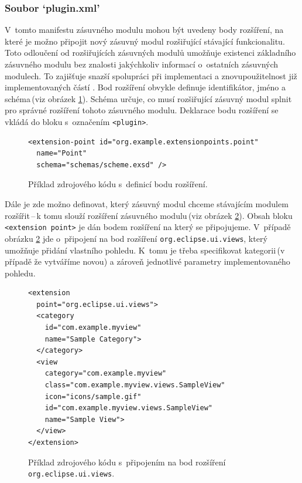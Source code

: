       \subsubsection{Soubor `plugin.xml'}
      V~tomto manifestu zásuvného modulu mohou být uvedeny body rozšíření, na které je možno připojit nový zásuvný modul rozšiřující stávající funkcionalitu. Toto odloučení od rozšiřujících zásuvných modulů umožňuje existenci základního zásuvného modulu bez znalosti jakýchkoliv informací o~ostatních zásuvných modulech. To zajišťuje snazší spolupráci při implementaci a znovupoužitelnost již implementovaných částí \cite{Plugins}. Bod rozšíření obvykle definuje identifikátor, jméno a schéma\,(viz obrázek \ref{code:extension_point_declaration}). Schéma určuje, co musí rozšiřující zásuvný modul splnit pro správné rozšíření tohoto zásuvného modulu. Deklarace bodu rozšíření se vkládá do bloku s~označením \texttt{<plugin>}. 

      \lstset{language=xml}
      \begin{figure}
	\begin{lstlisting}[frame=single]
<extension-point id="org.example.extensionpoints.point"
  name="Point"
  schema="schemas/scheme.exsd" />
	\end{lstlisting}
	\caption{Příklad zdrojového kódu s~definicí bodu rozšíření.}
	\label{code:extension_point_declaration}
      \end{figure}

      Dále je zde možno definovat, který zásuvný modul chceme stávajícím modulem rozšířit\,--\,k tomu slouží rozšíření zásuvného modulu\,(viz obrázek \ref{code:extension_declaration}). Obsah bloku \texttt{<extension point>} je dán bodem rozšíření na který se připojujeme. V~případě obrázku \ref{code:extension_declaration} jde o~připojení na bod rozšíření \texttt{org.eclipse.ui.views}, který umožňuje přidání vlastního pohledu. K~tomu je třeba specifikovat kategorii\,(v případě že vytváříme novou) a zároveň jednotlivé parametry implementovaného pohledu.

      \begin{figure}
	\begin{lstlisting}[frame=single]
<extension
  point="org.eclipse.ui.views">
  <category
    id="com.example.myview"
    name="Sample Category">
  </category>
  <view
    category="com.example.myview"
    class="com.example.myview.views.SampleView"
    icon="icons/sample.gif"
    id="com.example.myview.views.SampleView"
    name="Sample View">
  </view>
</extension>
	\end{lstlisting}
	\caption{Příklad zdrojového kódu s~připojením na bod rozšíření \texttt{org.eclipse.ui.views}.}
	\label{code:extension_declaration}
      \end{figure}